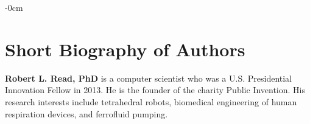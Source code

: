 \documentclass[mathematics,article,submit,pdftex,moreauthors]{Definitions/mdpi}
\begin{document}




\begin{adjustwidth}{-\extralength}{0cm}

\end{adjustwidth}

\section*{Short Biography of Authors}
\bio
{}
{\textbf{Robert L. Read, PhD} is a computer scientist who was a U.S. Presidential Innovation Fellow in 2013. He is the founder of the charity Public Invention. His research interests include tetrahedral robots,
  biomedical engineering of human respiration devices, and ferrofluid pumping. }
\end{document}
